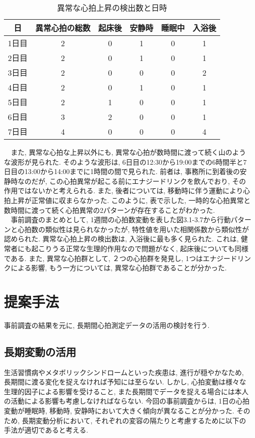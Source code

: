 \documentclass[report, 11pt, a4paper]{jsbook}
\begin{document}
\begin{table}[H]
\centering
\caption{異常な心拍上昇の検出数と日時}
\begin{tabular}{cccccc}
\hline
日  & 異常心拍の総数 & 起床後 & 安静時 & 睡眠中 & 入浴後 \\ \hline
1日目 & 2       & 0   & 1   & 0   & 1   \\
2日目 & 2       & 0   & 1   & 0   & 1   \\
3日目 & 2       & 0   & 0   & 0   & 2   \\
4日目 & 2       & 0   & 1   & 0   & 1   \\
5日目 & 2       & 1   & 0   & 0   & 1   \\
6日目 & 3       & 2   & 0   & 0   & 1   \\
7日目 & 4       & 0   & 0   & 0   & 4   \\ \hline
\end{tabular}
\end{table}

　また, 異常な心拍な上昇以外にも, 異常な心拍が数時間に渡って続く山のような波形が見られた. そのような波形は, 6日目の12:30から19:00までの6時間半と7日目の13:00から14:00までに1時間の間で見られた. 前者は, 事務所に到着後の安静時なのだが, この心拍異常が起こる前にエナジードリンクを飲んでおり, その作用ではないかと考えられる. また, 後者については, 移動時に伴う運動により心拍上昇が正常値に収まらなかった. このように, 表で示した, 一時的な心拍異常と数時間に渡って続く心拍異常の2パターンが存在することがわかった.\\
　事前調査のまとめとして, 1週間の心拍数変動を表した図3.1-3.7から行動パターンと心拍数の類似性は見られなかったが, 特性値を用いた相関係数から類似性が認められた. 
異常な心拍上昇の検出数は, 入浴後に最も多く見られた. これは, 健常者にも起こりうる正常な生理的作用なので問題がなく, 起床後についても同様である. また, 異常な心拍群として, ２つの心拍群を発見し, 1つはエナジードリンクによる影響, もう一方については, 異常な心拍群であることが分かった. 
　

\chapter{提案手法}
事前調査の結果を元に, 長期間心拍測定データの活用の検討を行う. 

\section{長期変動の活用}
生活習慣病やメタボリックシンドロームといった疾患は, 進行が穏やかなため, 長期間に渡る変化を捉えなければ予知には至らない. しかし, 心拍変動は様々な生理的因子による影響を受けること, また長期間でデータを捉える場合には本人の活動による影響も考慮しなければならない. 今回の事前調査からは, 1日の心拍変動が睡眠時, 移動時, 安静時において大きく傾向が異なることが分かった. そのため, 長期変動分析において, それぞれの変容の隔たりと考慮するために以下の手法が適切であると考える.
\end{document}
